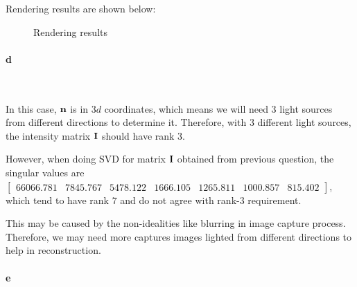 \documentclass[11pt]{article} \usepackage{fullpage} \usepackage{graphicx} \usepackage{epstopdf} \usepackage{color} \usepackage{psfrag} \usepackage{pdfsync}\usepackage{indentfirst}\usepackage{subfigure}\usepackage{float}\usepackage[section]{placeins}
\begin{document}
Rendering results are shown below:
\begin{figure}[H]
\centering
{}
\caption{Rendering results}
\end{figure}

\paragraph{d}~{}

In this case, $\bold{n}$ is in $3d$ coordinates, which means we will need $3$ light sources from different directions to determine it. Therefore, with $3$ different light sources, the intensity matrix $\bold{I}$ should have rank $3$.

However, when doing SVD for matrix $\bold{I}$ obtained from previous question, the singular values are $\begin{bmatrix} 66066.781 & 7845.767 & 5478.122 & 1666.105 &1265.811 & 1000.857 & 815.402 \end{bmatrix}$, which tend to have rank $7$ and do not agree with rank-$3$ requirement.

This may be caused by the non-idealities like blurring in image capture process. Therefore, we may need more captures images lighted from different directions to help in reconstruction.

\paragraph{e}~{}
\end{document}

